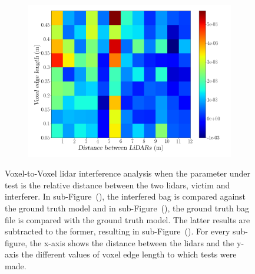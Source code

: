 \begin{figure}[!ht]
\begin{subfigure}[c]{0.45\textwidth}
	\label{fig:distance:octree-ground-truth-color-mesh}
\end{subfigure}
\\ \vspace{4mm}
\begin{subfigure}[c]{0.6\textwidth}
	\includegraphics[width=\textwidth]{img/lidar-interference/distance/octree_difference_color_mesh.png}
	\caption{}%
	\label{fig:distance:octree-difference-color-mesh}
\end{subfigure}

\caption[Voxel-to-Voxel analysis when the distance between the \acsp{lidar} is variated.]{Voxel-to-Voxel \ac{lidar} interference analysis when the parameter under test is the relative distance between the two \acp{lidar}, victim and interferer. In sub-Figure~(), the interfered bag is compared against the ground truth model and in sub-Figure~(), the ground truth bag file is compared with the ground truth model. The latter results are subtracted to the former, resulting in sub-Figure~(). For every sub-figure, the x-axis shows the distance between the \acp{lidar} and the y-axis the different values of voxel edge length to which tests were made.}
\label{fig:distance:octree-color-mesh}
\end{figure}

